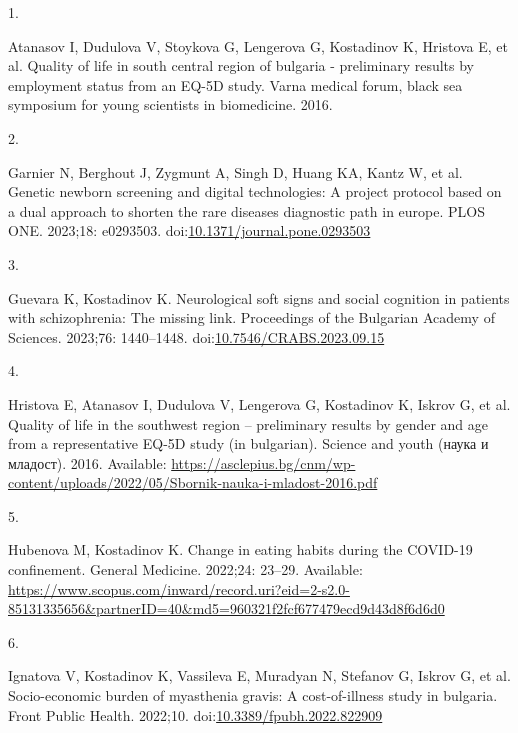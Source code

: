\documentclass[
  12pt,
  letterpaper,
  DIV=11,
  numbers=noendperiod]{scrartcl}
\newlength{\cslhangindent}
\newlength{\csllabelwidth}
\newenvironment{CSLReferences}[2] %
 {\begin{list}{}{%
  \setlength{\itemindent}{0pt}
  \setlength{\leftmargin}{0pt}
  \setlength{\parsep}{0pt}
  \ifodd #1
   \setlength{\leftmargin}{\cslhangindent}
   \setlength{\itemindent}{-1\cslhangindent}
  \fi
  \setlength{\itemsep}{#2\baselineskip}}}
 {\end{list}}
\newcommand{\CSLLeftMargin}[1]{\parbox[t]{\csllabelwidth}{\strut#1\strut}}
\newcommand{\CSLRightInline}[1]{\parbox[t]{\linewidth - \csllabelwidth}{\strut#1\strut}}
\begin{document}
\label{refs}
\begin{CSLReferences}{0}{1}
\nocite{*}

\CSLLeftMargin{1. }%
\CSLRightInline{Atanasov I, Dudulova V, Stoykova G, Lengerova G,
Kostadinov K, Hristova E, et al. Quality of life in south central region
of bulgaria - preliminary results by employment status from an EQ-5D
study. Varna medical forum, black sea symposium for young scientists in
biomedicine. 2016. }

\CSLLeftMargin{2. }%
\CSLRightInline{Garnier N, Berghout J, Zygmunt A, Singh D, Huang KA,
Kantz W, et al. Genetic newborn screening and digital technologies: A
project protocol based on a dual approach to shorten the rare diseases
diagnostic path in europe. PLOS ONE. 2023;18: e0293503.
doi:\href{https://doi.org/10.1371/journal.pone.0293503}{10.1371/journal.pone.0293503}}

\CSLLeftMargin{3. }%
\CSLRightInline{Guevara K, Kostadinov K. Neurological soft signs and
social cognition in patients with schizophrenia: The missing link.
Proceedings of the Bulgarian Academy of Sciences. 2023;76: 1440--1448.
doi:\href{https://doi.org/10.7546/CRABS.2023.09.15}{10.7546/CRABS.2023.09.15}}

\CSLLeftMargin{4. }%
\CSLRightInline{Hristova E, Atanasov I, Dudulova V, Lengerova G,
Kostadinov K, Iskrov G, et al. Quality of life in the southwest region
-- preliminary results by gender and age from a representative EQ-5D
study (in bulgarian). Science and youth (наука и младост). 2016.
Available:
\url{https://asclepius.bg/cnm/wp-content/uploads/2022/05/Sbornik-nauka-i-mladost-2016.pdf}}

\CSLLeftMargin{5. }%
\CSLRightInline{Hubenova M, Kostadinov K. Change in eating habits during
the COVID-19 confinement. General Medicine. 2022;24: 23--29. Available:
\url{https://www.scopus.com/inward/record.uri?eid=2-s2.0-85131335656&partnerID=40&md5=960321f2fcf677479ecd9d43d8f6d6d0}}

\CSLLeftMargin{6. }%
\CSLRightInline{Ignatova V, Kostadinov K, Vassileva E, Muradyan N,
Stefanov G, Iskrov G, et al. Socio-economic burden of myasthenia gravis:
A cost-of-illness study in bulgaria. Front Public Health. 2022;10.
doi:\href{https://doi.org/10.3389/fpubh.2022.822909}{10.3389/fpubh.2022.822909}}


\end{CSLReferences}
\end{document}
